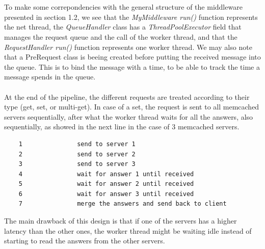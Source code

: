 \documentclass[11pt,a4paper]{article}
\begin{document}
\\\\
To make some correpondencies with the general structure of the middleware presented in section 1.2, we see that the \textit{MyMiddleware run()} function represents the net thread, the \textit{QueueHandler} class has a \textit{ThreadPoolExecutor} field that manages the request queue and the call of the worker thread, and that the \textit{RequestHandler run()} function represents one worker thread. We may also note that a PreRequest class is beeing created before putting the received message into the queue. This is to bind the message with a time, to be able to track the time a message spends in the queue. 
\\\\
At the end of the pipeline, the different requests are treated according to their type (get, set, or multi-get). In case of a set, the request is sent to all memcached servers sequentially, after what the worker thread waits for all the answers, also sequentially, as showed in the next line in the case of 3 memcached servers. 
\begin{lstlisting}
	1				send to server 1
	2				send to server 2
	3				send to server 3
	4				wait for answer 1 until received
	5				wait for answer 2 until received
	6				wait for answer 3 until received
	7				merge the answers and send back to client
\end{lstlisting}
The main drawback of this design is that if one of the servers has a higher latency than the other ones, the worker thread might be waiting idle instead of starting to read the answers from the other servers. 
\end{document}
